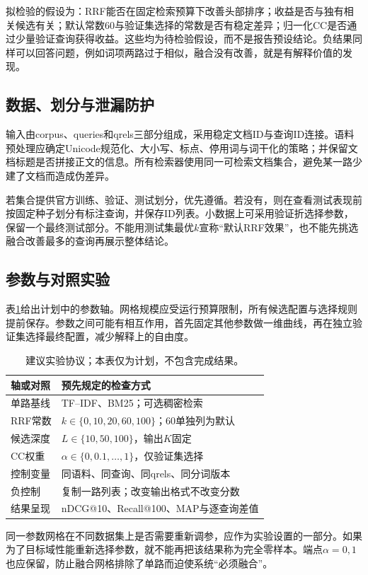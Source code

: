 \documentclass[sigconf,nonacm]{acmart}
\begin{document}
拟检验的假设为：RRF能否在固定检索预算下改善头部排序；收益是否与独有相关候选有关；默认常数60与验证集选择的常数是否有稳定差异；归一化CC是否通过少量验证查询获得收益。这些均为待检验假设，而不是报告预设结论。负结果同样可以回答问题，例如词项两路过于相似，融合没有改善，就是有解释价值的发现。

\subsection{数据、划分与泄漏防护}
输入由corpus、queries和qrels三部分组成，采用稳定文档ID与查询ID连接。语料预处理应确定Unicode规范化、大小写、标点、停用词与词干化的策略；并保留文档标题是否拼接正文的信息。所有检索器使用同一可检索文档集合，避免某一路少建了文档而造成伪差异。

若集合提供官方训练、验证、测试划分，优先遵循。若没有，则在查看测试表现前按固定种子划分有标注查询，并保存ID列表。小数据上可采用验证折选择参数，保留一个最终测试部分。不能用测试集最优$k$宣称“默认RRF效果”，也不能先挑选融合改善最多的查询再展示整体结论。

\subsection{参数与对照实验}
表\ref{tab:protocol}给出计划中的参数轴。网格规模应受运行预算限制，所有候选配置与选择规则提前保存。参数之间可能有相互作用，首先固定其他参数做一维曲线，再在独立验证集选择最终配置，减少解释上的自由度。
\begin{table}[ht]
\caption{建议实验协议；本表仅为计划，不包含完成结果。}
\label{tab:protocol}
\centering\small
\begin{tabular}{p{}p{}}\toprule
轴或对照&预先规定的检查方式\\\midrule
单路基线&TF--IDF、BM25；可选稠密检索\\
RRF常数&$k\in\{0,10,20,60,100\}$；60单独列为默认\\
候选深度&$L\in\{10,50,100\}$，输出$K$固定\\
CC权重&$\alpha\in\{0,0.1,\ldots,1\}$，仅验证集选择\\
控制变量&同语料、同查询、同qrels、同分词版本\\
负控制&复制一路列表；改变输出格式不改变分数\\
结果呈现&nDCG@10、Recall@100、MAP与逐查询差值\\\bottomrule
\end{tabular}
\end{table}

同一参数网格在不同数据集上是否需要重新调参，应作为实验设置的一部分。如果为了目标域性能重新选择参数，就不能再把该结果称为完全零样本。端点$\alpha=0,1$也应保留，防止融合网格排除了单路而迫使系统“必须融合”。
\end{document}
